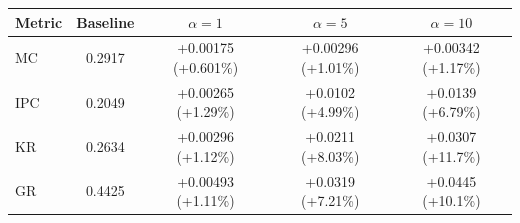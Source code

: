 \begin{tabular}{lcccc}
\toprule
Metric & Baseline & $\alpha=1$ & $\alpha=5$ & $\alpha=10$ \\
\midrule
MC & 0.2917 & +0.00175 (+0.601\%) & +0.00296 (+1.01\%) & +0.00342 (+1.17\%) \\
IPC & 0.2049 & +0.00265 (+1.29\%) & +0.0102 (+4.99\%) & +0.0139 (+6.79\%) \\
KR & 0.2634 & +0.00296 (+1.12\%) & +0.0211 (+8.03\%) & +0.0307 (+11.7\%) \\
GR & 0.4425 & +0.00493 (+1.11\%) & +0.0319 (+7.21\%) & +0.0445 (+10.1\%) \\
\bottomrule
\end{tabular}
